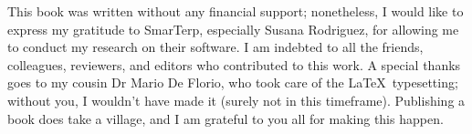 
This book was written without any financial support; nonetheless, I would like to express my gratitude to SmarTerp, especially Susana Rodriguez, for allowing me to conduct my research on their software. I am indebted to all the friends, colleagues, reviewers, and editors who contributed to this work. A special thanks goes to my cousin Dr Mario De Florio, who took care of the \LaTeX\ typesetting; without you, I wouldn't have made it (surely not in this timeframe). Publishing a book does take a village, and I am grateful to you all for making this happen.
